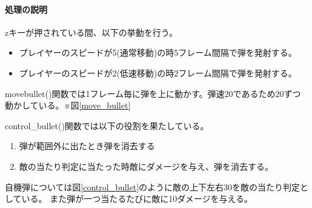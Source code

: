 \documentclass[a4paper,titlepage,11pt]{ltjsarticle}
\begin{document}
\paragraph{処理の説明}
zキーが押されている間、以下の挙動を行う。
\begin{itemize}
	\item プレイヤーのスピードが5(通常移動)の時5フレーム間隔で弾を発射する。
	\item プレイヤーのスピードが2(低速移動)の時2フレーム間隔で弾を発射する。
\end{itemize}
movebullet()関数では1フレーム毎に弾を上に動かす。弾速20であるため20ずつ
動かしている。※図\ref{move_bullet}

control\_bullet()関数では以下の役割を果たしている。
\begin{enumerate}
	\item 弾が範囲外に出たとき弾を消去する
	\item 敵の当たり判定に当たった時敵にダメージを与え、弾を消去する。
\end{enumerate}

自機弾については図\ref{control_bullet}のように敵の上下左右30を敵の当たり判定としている。
また弾が一つ当たるたびに敵に10ダメージを与える。
\end{document}
